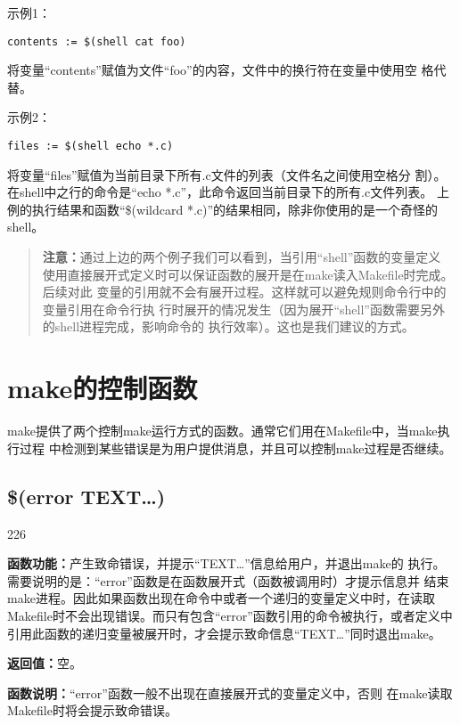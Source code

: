 示例1：
\begin{Verbatim}[]
contents := $(shell cat foo)
\end{Verbatim}

\noindent 将变量“contents”赋值为文件“foo”的内容，文件中的换行符在变量中使用空
格代替。

示例2：
\begin{Verbatim}[]
files := $(shell echo *.c)
\end{Verbatim}

\noindent 将变量“files”赋值为当前目录下所有.c文件的列表（文件名之间使用空格分
割）。在shell中之行的命令是“echo *.c”，此命令返回当前目录下的所有.c文件列表。
上例的执行结果和函数“\$(wildcard *.c)”的结果相同，除非你使用的是一个奇怪的
shell。

\begin{quote}\kaishu
\textbf{注意：}通过上边的两个例子我们可以看到，当引用“shell”函数的变量定义
使用直接展开式定义时可以保证函数的展开是在make读入Makefile时完成。后续对此
变量的引用就不会有展开过程。这样就可以避免规则命令行中的变量引用在命令行执
行时展开的情况发生（因为展开“shell”函数需要另外的shell进程完成，影响命令的
执行效率）。这也是我们建议的方式。
\end{quote}

\section{make的控制函数}
make提供了两个控制make运行方式的函数。通常它们用在Makefile中，当make执行过程
中检测到某些错误是为用户提供消息，并且可以控制make过程是否继续。

\subsection{\$(error TEXT…)}
\begin{dinglist}{226}
\itemsep=4pt \parskip=0pt
\item \textbf{函数功能：}产生致命错误，并提示“TEXT…”信息给用户，并退出make的
    执行。需要说明的是：“error”函数是在函数展开式（函数被调用时）才提示信息并
    结束make进程。因此如果函数出现在命令中或者一个递归的变量定义中时，在读取
    Makefile时不会出现错误。而只有包含“error”函数引用的命令被执行，或者定义中
    引用此函数的递归变量被展开时，才会提示致命信息“TEXT…”同时退出make。

\item \textbf{返回值：}空。

\item \textbf{函数说明：}“error”函数一般不出现在直接展开式的变量定义中，否则
    在make读取Makefile时将会提示致命错误。
\end{dinglist}

